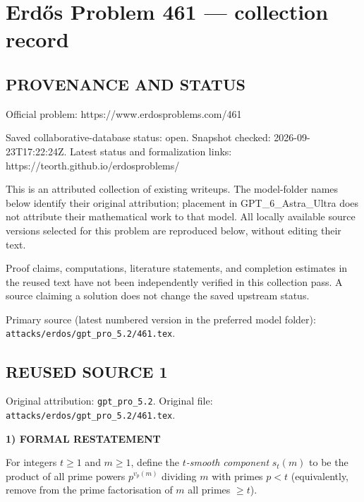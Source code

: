 \section*{Erd\H{o}s Problem 461 --- collection record}

\subsection*{PROVENANCE AND STATUS}
Official problem: https://www.erdosproblems.com/461

Saved collaborative-database status: open.
Snapshot checked: 2026-09-23T17:22:24Z.
Latest status and formalization links: https://teorth.github.io/erdosproblems/

This is an attributed collection of existing writeups. The model-folder names below identify their original attribution; placement in GPT\_6\_Astra\_Ultra does not attribute their mathematical work to that model. All locally available source versions selected for this problem are reproduced below, without editing their text.

Proof claims, computations, literature statements, and completion estimates in the reused text have not been independently verified in this collection pass. A source claiming a solution does not change the saved upstream status.

Primary source (latest numbered version in the preferred model folder): \texttt{attacks/erdos/gpt\_pro\_5.2/461.tex}.

\subsection*{REUSED SOURCE 1}
Original attribution: \texttt{gpt\_pro\_5.2}.
Original file: \texttt{attacks/erdos/gpt\_pro\_5.2/461.tex}.


\noindent\textbf{1) FORMAL RESTATEMENT}

For integers $t\ge 1$ and $m\ge 1$, define the \emph{$t$-smooth component} $s_t(m)$ to be the product of all prime powers $p^{v_p(m)}$ dividing $m$ with primes $p<t$ (equivalently, remove from the prime factorisation of $m$ all primes $\ge t$).


